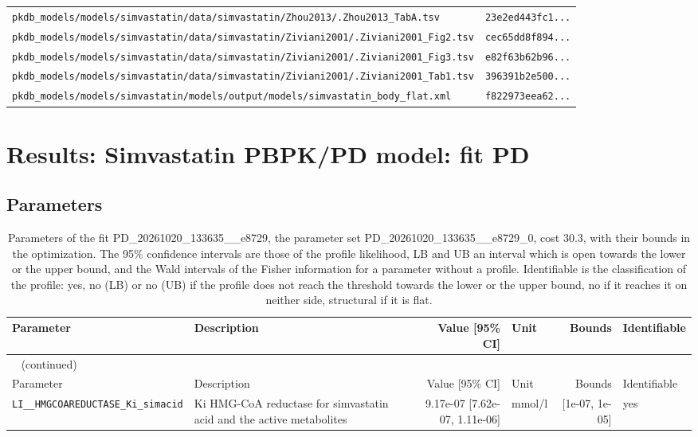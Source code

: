 \documentclass{article}
\begin{document}
\begin{longtable}{ll}
\texttt{pkdb\_models/models/simvastatin/data/simvastatin/Zhou2013/.Zhou2013\_TabA.tsv} & \texttt{23e2ed443fc1...} \\
\texttt{pkdb\_models/models/simvastatin/data/simvastatin/Ziviani2001/.Ziviani2001\_Fig2.tsv} & \texttt{cec65dd8f894...} \\
\texttt{pkdb\_models/models/simvastatin/data/simvastatin/Ziviani2001/.Ziviani2001\_Fig3.tsv} & \texttt{e82f63b62b96...} \\
\texttt{pkdb\_models/models/simvastatin/data/simvastatin/Ziviani2001/.Ziviani2001\_Tab1.tsv} & \texttt{396391b2e500...} \\
\texttt{pkdb\_models/models/simvastatin/models/output/models/simvastatin\_body\_flat.xml} & \texttt{f822973eea62...} \\
\end{longtable}

\section{Results: Simvastatin PBPK/PD model: fit PD}

\subsection{Parameters}

\begin{longtable}{llrlrl}
\caption{Parameters of the fit PD\_20261020\_133635\_\_e8729, the parameter set PD\_20261020\_133635\_\_e8729\_0, cost 30.3, with their bounds in the optimization. The 95\% confidence intervals are those of the profile likelihood, LB and UB an interval which is open towards the lower or the upper bound, and the Wald intervals of the Fisher information for a parameter without a profile. Identifiable is the classification of the profile: yes, no (LB) or no (UB) if the profile does not reach the threshold towards the lower or the upper bound, no if it reaches it on neither side, structural if it is flat.}\label{tab:parameters:PD_20261020_133635__e8729} \\
\toprule
Parameter & Description & Value [95\% CI] & Unit & Bounds & Identifiable \\
\midrule
\endfirsthead
\multicolumn{6}{l}{\small\tablename~\thetable{} (continued)} \\
\toprule
Parameter & Description & Value [95\% CI] & Unit & Bounds & Identifiable \\
\midrule
\endhead
\bottomrule
\endlastfoot
\texttt{LI\_\_HMGCOAREDUCTASE\_Ki\_simacid} & Ki HMG-CoA reductase for simvastatin acid and the active metabolites & 9.17e-07 [7.62e-07, 1.11e-06] & mmol/l & [1e-07, 1e-05] & yes \\
\end{longtable}
\end{document}

